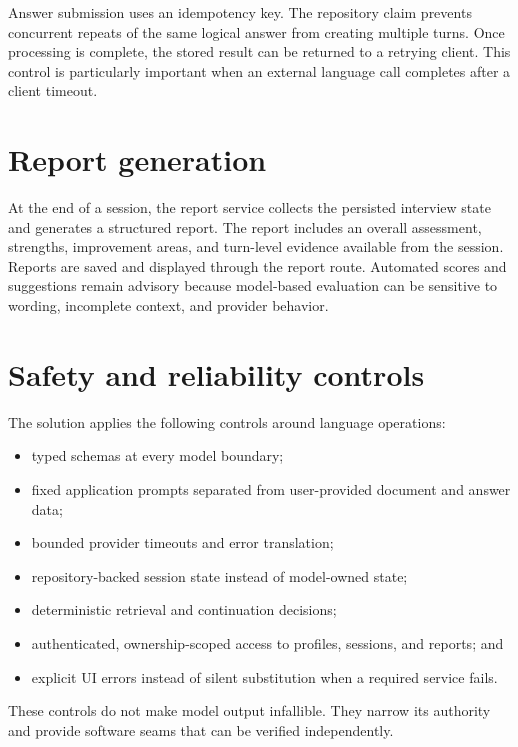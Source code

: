 
Answer submission uses an idempotency key. The repository claim prevents concurrent repeats of the same logical answer from creating multiple turns. Once processing is complete, the stored result can be returned to a retrying client. This control is particularly important when an external language call completes after a client timeout.

\section{Report generation}

At the end of a session, the report service collects the persisted interview state and generates a structured report. The report includes an overall assessment, strengths, improvement areas, and turn-level evidence available from the session. Reports are saved and displayed through the report route. Automated scores and suggestions remain advisory because model-based evaluation can be sensitive to wording, incomplete context, and provider behavior.

\section{Safety and reliability controls}

The solution applies the following controls around language operations:
\begin{itemize}
  \item typed schemas at every model boundary;
  \item fixed application prompts separated from user-provided document and answer data;
  \item bounded provider timeouts and error translation;
  \item repository-backed session state instead of model-owned state;
  \item deterministic retrieval and continuation decisions;
  \item authenticated, ownership-scoped access to profiles, sessions, and reports; and
  \item explicit UI errors instead of silent substitution when a required service fails.
\end{itemize}

These controls do not make model output infallible. They narrow its authority and provide software seams that can be verified independently.
